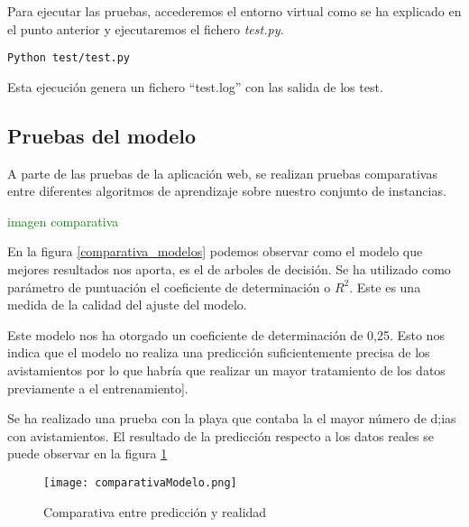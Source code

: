 Para ejecutar las pruebas, accederemos el entorno virtual como se ha explicado en el punto anterior y ejecutaremos el fichero \emph{test.py}.
\begin{verbatim}
Python test/test.py
\end{verbatim}

Esta ejecución genera un fichero ``test.log'' con las salida de los test.

\subsection{Pruebas del modelo}

A parte de las pruebas de la aplicación web, se realizan pruebas comparativas entre diferentes algoritmos de aprendizaje sobre nuestro conjunto de instancias.

\textcolor{green}{imagen comparativa}

En la figura \ref{comparativa_modelos} podemos observar como el modelo que mejores resultados nos aporta, es el de arboles de decisión. Se ha utilizado como parámetro de puntuación el coeficiente de determinación o \(R^2\). Este es una medida de la calidad del ajuste del modelo.

Este modelo nos ha otorgado un coeficiente de determinación de 0,25. Esto nos indica que el modelo no realiza una predicción suficientemente precisa de los avistamientos por lo que habría que realizar un mayor tratamiento de los datos previamente a el entrenamiento].

Se ha realizado una prueba con la playa que contaba la el mayor número de d;ias con avistamientos. El resultado de la predicción respecto a los datos reales se puede observar en la figura \ref{fig:comparativa}
 

\begin{figure}[!h]
	\centering
	\texttt{[image: comparativaModelo.png]}
	\caption{Comparativa entre predicción y realidad}\label{fig:comparativa}
\end{figure}